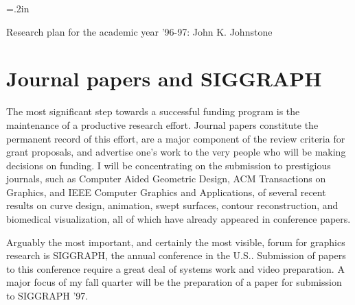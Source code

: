 \makeatletter
\def\@maketitle{\newpage
 \null
 \vskip 2em                   %
 \begin{center}
       {\Large\bf \@title \par}  %
       \vskip .5em               %
       {\lineskip .5em           %
        \begin{tabular}[t]{c}\@author 
        \end{tabular}\par}                   
  \end{center}
 \par
 \vskip .5em}                 %
\makeatother

\parskip=.2in
\parindent=0pt
\setlength{\oddsidemargin}{0pt}
\setlength{\topmargin}{-.25in}	%
\setlength{\headsep}{0pt}
\setlength{\textheight}{8.75in}
\setlength{\textwidth}{6.5in}
\setlength{\columnsep}{5mm}		%



\centerline{Research plan for the academic year '96-97: John K. Johnstone}

\section{Journal papers and SIGGRAPH}

The most significant step towards a successful funding program
is the maintenance of a productive research effort.
Journal papers constitute the permanent record of this effort,
are a major component of the review criteria for grant proposals, 
and advertise one's work to the very people who will be making decisions 
on funding.
I will be concentrating on the submission to prestigious journals,
such as Computer Aided Geometric Design, ACM Transactions on Graphics,
and IEEE Computer Graphics and Applications, of several
recent results on curve design, animation, swept surfaces,
contour reconstruction, and biomedical visualization, all of which
have already appeared in conference papers.

Arguably the most important, and certainly the most visible, forum
for graphics research is SIGGRAPH,
the annual conference in the U.S..  Submission of papers to this conference
require a great deal of systems work and video preparation.
A major focus of my fall quarter will be the preparation of a paper
for submission to SIGGRAPH '97.


